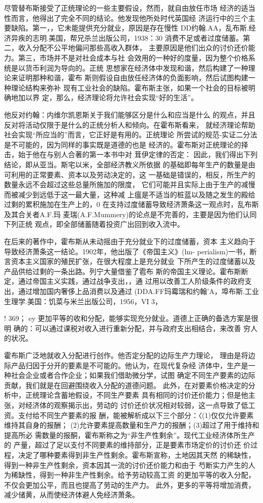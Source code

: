 尽管替布斯接受了正统理论的一些主要假设，然而，就自由放任市场
经济的适当性而言，他得出了完全不同的结论。他发现他所处时代英国经
济运行中的三个主要缺陷。第一，，它未能提供充分就业，原因是存在慢性
DD约翰.AA，乱布斯.经济异疾的志明.美国，帮兄杀兰出版公司，1938：30
消费不足或者过度储蓄。第二，收入分配不公平地偏问那些高收入群体，
主要原因是他们出众的讨价还价能力。第三，市场并不是对社会成本与社
会效用的一种好的度量，因为整个价格系统是以货币利润为导向的。正统
思想家在经济体中发现和谐，然后构建了一种理论来证明那种和谐，霍布
斯则假设自由放任经济体的负面影响，然后试图构建一种理论结构来弥补
现有工业社会的缺陷。霍布斯主张，如果一个社会的目标被明确地加以界
定，那么，经济理论将允许社会实现“好的生活”。

他反对约翰：内维尔凯恩斯关于我们能够区分是什么和应当是什么
的观点，并且反对将活动仅限于是什么的正统分析人和倾向。在霍布斯看来，
就经济理论帮助社会实现“所应当的”而言，它正好是有用的。正统理论
所尝试的规范-实证二分法是不可能的，因为同样的事实既是道德的也是
经济的。霍布斯对正统理论的择击，始于他在与别人合著的第一本书中对
茸伊定律的否定：
因此，我们得出下列结论，即从亚当。斯宅以米，全部经济教义所依据
的基础即每年生产的数量是由可利用的正常要素、资本以及劳动决定的，这
一基础是错误的，相反，所生产的数量永远不会超过这些总量所施加的限度，
它们可能并且实际上由于生产的减慢而被减少到远低于这一最大量，这种减
上瘟是不适当的桩蓝以及随之发生的殿给过剩的累积施加在生产上的，0
在支持过度储蓄导致经济萧条这一观点时，乱布斯及其合关者A.F.玛
麦瑞(A.F.Mummery)的论点是不完善的，主要是因为他们认同下列正统
观点，即全部储蓄随着投资广出回到收入流中。

在后来的著作中，霍布斯从未动摇由于充分就业下的过度储蓄，资本
主义趋向于导致经济萧条这一结论。1902年，他出版了《帝国主义》(lm-
perialism)一书，断言资本主义国家的殖民扩张，在很大程度上是充分就业
下所产生的过度储蓄以及产品供给过剩的一条出路。列宁大量借鉴了雹布
斯的帝国主义理论。霍布斯断定，通过帝国主义实践，通过战争支出，，通
过用以改善工人阶级条件的政府支出，通过增加国内奢侈上品消费以及通过
(DDA.FF玛霉瑞和约翰'A，埠布斯.工业生理学.美国：饥菜与米兰出版公司，1956，VI
3，

!
369；
ey
更加平等的收和分配，能够实现充分就业。道德上正确的备选方案是很明
确的：可以通过课税对收入进行重新分配，并与政府支出相结合，来改善
穷人的状况。

霍布斯广泛地就收入分配进行创作。他否定分配的边际生产力理论，
理由是将边际产品归因于分开的要素是不可能的。他认为，在现代复杂经
济体中，生产是一种社会企业或者合作企业；如果我们借助微分学，试图
确定不同生产要素的边际贡献，我们就是在回避围绕收入分配的道德问题。
此外，在对要素价格决定的分析中，正统理论含蓄地假设，不同生产要素
具有相同的讨价还价能力；但是他主张，对经济体的观察揭示出，劳动的
讨价还价状况相对较弱，这一点导致了低工资。支付给不同生产要素的报
酬，能被解析成以下三个部分：〈(1)仅仅允许要素维持其自身的报酬；
(2)允许要素提高数量和生产力的报酬；(3)超过了用于维持和提高所必
需数量的报酮，霍布斯称之为“非生产性剩余”。现代工业经济体所生产的
产量，超过了足以支付不同要素的维持部分，正是要素市场定价的讨价还
价过程，决定了哪种要素得到非生产性剩余。霍布斯宣称，土地因其天然
的稀缺性，得到一种非生产性剩余，资本因其一流的讨价还价能力和由于
芍断实力产生的人为稀缺性，得到一种非生产性剩余。给予劳动较高工资
的更加平等的收入分配，不仅会更加公平，而且也提高了劳动的生产力。
此外，更多的平等将增加消费，减少储黄，从而使经济体避人免经济萧条。

